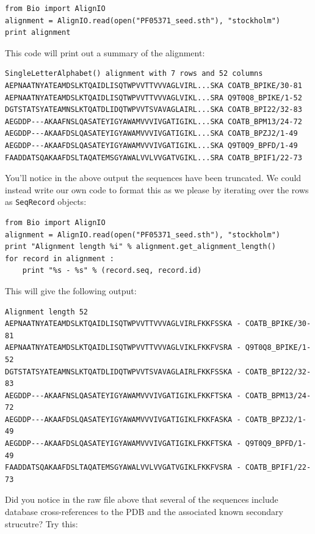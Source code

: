 \documentclass{report}
\begin{document}
\begin{verbatim}
from Bio import AlignIO
alignment = AlignIO.read(open("PF05371_seed.sth"), "stockholm")
print alignment
\end{verbatim}

\noindent This code will print out a summary of the alignment:

\begin{verbatim}
SingleLetterAlphabet() alignment with 7 rows and 52 columns
AEPNAATNYATEAMDSLKTQAIDLISQTWPVVTTVVVAGLVIRL...SKA COATB_BPIKE/30-81
AEPNAATNYATEAMDSLKTQAIDLISQTWPVVTTVVVAGLVIKL...SRA Q9T0Q8_BPIKE/1-52
DGTSTATSYATEAMNSLKTQATDLIDQTWPVVTSVAVAGLAIRL...SKA COATB_BPI22/32-83
AEGDDP---AKAAFNSLQASATEYIGYAWAMVVVIVGATIGIKL...SKA COATB_BPM13/24-72
AEGDDP---AKAAFDSLQASATEYIGYAWAMVVVIVGATIGIKL...SKA COATB_BPZJ2/1-49
AEGDDP---AKAAFDSLQASATEYIGYAWAMVVVIVGATIGIKL...SKA Q9T0Q9_BPFD/1-49
FAADDATSQAKAAFDSLTAQATEMSGYAWALVVLVVGATVGIKL...SRA COATB_BPIF1/22-73
\end{verbatim}

You'll notice in the above output the sequences have been truncated.  We could instead write our own code to format this as we please by iterating over the rows as \verb|SeqRecord| objects:

\begin{verbatim}
from Bio import AlignIO
alignment = AlignIO.read(open("PF05371_seed.sth"), "stockholm")
print "Alignment length %i" % alignment.get_alignment_length()
for record in alignment :
    print "%s - %s" % (record.seq, record.id)
\end{verbatim}

\noindent This will give the following output:

\begin{verbatim}
Alignment length 52
AEPNAATNYATEAMDSLKTQAIDLISQTWPVVTTVVVAGLVIRLFKKFSSKA - COATB_BPIKE/30-81
AEPNAATNYATEAMDSLKTQAIDLISQTWPVVTTVVVAGLVIKLFKKFVSRA - Q9T0Q8_BPIKE/1-52
DGTSTATSYATEAMNSLKTQATDLIDQTWPVVTSVAVAGLAIRLFKKFSSKA - COATB_BPI22/32-83
AEGDDP---AKAAFNSLQASATEYIGYAWAMVVVIVGATIGIKLFKKFTSKA - COATB_BPM13/24-72
AEGDDP---AKAAFDSLQASATEYIGYAWAMVVVIVGATIGIKLFKKFASKA - COATB_BPZJ2/1-49
AEGDDP---AKAAFDSLQASATEYIGYAWAMVVVIVGATIGIKLFKKFTSKA - Q9T0Q9_BPFD/1-49
FAADDATSQAKAAFDSLTAQATEMSGYAWALVVLVVGATVGIKLFKKFVSRA - COATB_BPIF1/22-73
\end{verbatim}

Did you notice in the raw file above that several of the sequences include database cross-references to the PDB and the associated known secondary strucutre?  Try this:
\end{document}
